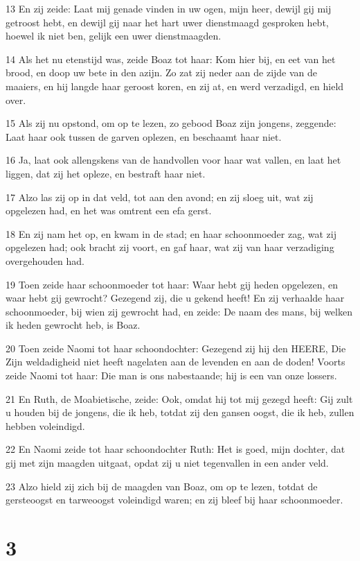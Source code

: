 \par 13 En zij zeide: Laat mij genade vinden in uw ogen, mijn heer, dewijl gij mij getroost hebt, en dewijl gij naar het hart uwer dienstmaagd gesproken hebt, hoewel ik niet ben, gelijk een uwer dienstmaagden.
\par 14 Als het nu etenstijd was, zeide Boaz tot haar: Kom hier bij, en eet van het brood, en doop uw bete in den azijn. Zo zat zij neder aan de zijde van de maaiers, en hij langde haar geroost koren, en zij at, en werd verzadigd, en hield over.
\par 15 Als zij nu opstond, om op te lezen, zo gebood Boaz zijn jongens, zeggende: Laat haar ook tussen de garven oplezen, en beschaamt haar niet.
\par 16 Ja, laat ook allengskens van de handvollen voor haar wat vallen, en laat het liggen, dat zij het opleze, en bestraft haar niet.
\par 17 Alzo las zij op in dat veld, tot aan den avond; en zij sloeg uit, wat zij opgelezen had, en het was omtrent een efa gerst.
\par 18 En zij nam het op, en kwam in de stad; en haar schoonmoeder zag, wat zij opgelezen had; ook bracht zij voort, en gaf haar, wat zij van haar verzadiging overgehouden had.
\par 19 Toen zeide haar schoonmoeder tot haar: Waar hebt gij heden opgelezen, en waar hebt gij gewrocht? Gezegend zij, die u gekend heeft! En zij verhaalde haar schoonmoeder, bij wien zij gewrocht had, en zeide: De naam des mans, bij welken ik heden gewrocht heb, is Boaz.
\par 20 Toen zeide Naomi tot haar schoondochter: Gezegend zij hij den HEERE, Die Zijn weldadigheid niet heeft nagelaten aan de levenden en aan de doden! Voorts zeide Naomi tot haar: Die man is ons nabestaande; hij is een van onze lossers.
\par 21 En Ruth, de Moabietische, zeide: Ook, omdat hij tot mij gezegd heeft: Gij zult u houden bij de jongens, die ik heb, totdat zij den gansen oogst, die ik heb, zullen hebben voleindigd.
\par 22 En Naomi zeide tot haar schoondochter Ruth: Het is goed, mijn dochter, dat gij met zijn maagden uitgaat, opdat zij u niet tegenvallen in een ander veld.
\par 23 Alzo hield zij zich bij de maagden van Boaz, om op te lezen, totdat de gersteoogst en tarweoogst voleindigd waren; en zij bleef bij haar schoonmoeder.

\chapter{3}

